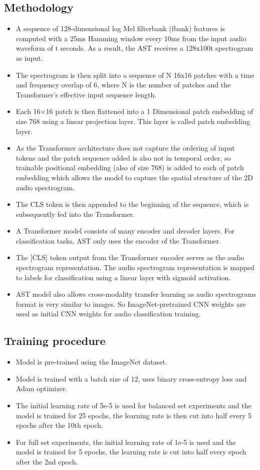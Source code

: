 \subsection{Methodology}
\begin{itemize}
\item A sequence of 128-dimensional log Mel filterbank (fbank) features is computed with a 25ms Hamming window every 10ms from the input audio waveform of t seconds. As a result, the AST receives a 128x100t spectrogram as input.
\item The spectrogram is then split into a sequence of N 16x16 patches with a time and frequency overlap of 6, where N is the number of patches and the Transformer's effective input sequence length.
\item Each 16×16 patch is then flattened into a 1 Dimensional patch embedding of size 768 using a linear projection layer. This layer is called patch embedding layer.
\item As the Transformer architecture does not capture the ordering of input tokens and the patch sequence added is also not in temporal order, so trainable positional embedding (also of size 768) is added to each of patch embedding which allows the model to capture the spatial structure of the 2D audio spectrogram. 
\item The CLS token is then appended to the beginning of the sequence, which is subsequently fed into the Transformer.
\item A Transformer model consists of many encoder and decoder layers. For classification tasks, AST only uses the encoder of the Transformer.
\item The [CLS] token output from the Transformer encoder serves as the audio spectrogram representation. The audio spectrogram representation is mapped to labels for classification using a linear layer with sigmoid activation.
\item AST model also allows cross-modality transfer learning as audio spectrograms format is very similar to images. So ImageNet-pretrained CNN weights are used as initial CNN weights for audio classification training. 
\end{itemize}

\subsection{Training procedure}
\begin{itemize}
\item Model is pre-trained using the ImageNet dataset. 
\item Model is trained  with a batch size of 12, uses binary cross-entropy loss and Adam optimizer.
\item The initial learning rate of 5e-5  is used for balanced set experiments and the model is trained for 25 epochs, the learning rate is then cut into half every 5 epochs after the 10th epoch.  
\item For full set experiments, the  initial learning rate of 1e-5 is used and the model is trained for 5 epochs, the learning rate is cut into half every epoch after the 2nd epoch.
\end{itemize}

